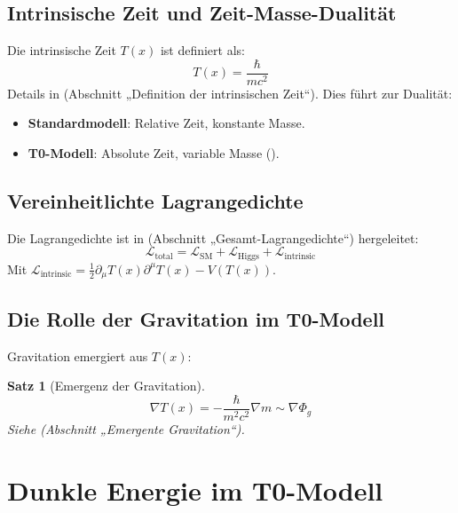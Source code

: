 \documentclass[a4paper,12pt]{article}
\newtheorem{theorem}{Satz}[section]
\theoremstyle{definition}
\theoremstyle{remark}
\newcommand{\Tfield}{T(x)}
\begin{document}
	\subsection{Intrinsische Zeit und Zeit-Masse-Dualität}
	
	Die intrinsische Zeit \(\Tfield\) ist definiert als:
	\begin{equation}
		\Tfield = \frac{\hbar}{m c^2}
	\end{equation}
	Details in \cite{pascher_params_2025} (Abschnitt „Definition der intrinsischen Zeit“). Dies führt zur Dualität:
	\begin{itemize}
		\item \textbf{Standardmodell}: Relative Zeit, konstante Masse.
		\item \textbf{T0-Modell}: Absolute Zeit, variable Masse (\cite{pascher_params_2025}).
	\end{itemize}
	
	\subsection{Vereinheitlichte Lagrangedichte}
	
	Die Lagrangedichte ist in \cite{pascher_lagrange_2025} (Abschnitt „Gesamt-Lagrangedichte“) hergeleitet:
	\begin{equation}
		\mathcal{L}_\text{total} = \mathcal{L}_\text{SM} + \mathcal{L}_\text{Higgs} + \mathcal{L}_\text{intrinsic}
	\end{equation}
	Mit \(\mathcal{L}_\text{intrinsic} = \frac{1}{2} \partial_\mu \Tfield \partial^\mu \Tfield - V(\Tfield)\).
	
	\subsection{Die Rolle der Gravitation im T0-Modell}
	
	Gravitation emergiert aus \(\Tfield\):
	\begin{theorem}[Emergenz der Gravitation]
		\begin{equation}
			\nabla \Tfield = -\frac{\hbar}{m^2 c^2} \nabla m \sim \nabla \Phi_g
		\end{equation}
		Siehe \cite{pascher_galaxies_2025} (Abschnitt „Emergente Gravitation“).
	\end{theorem}
	
	\section{Dunkle Energie im T0-Modell}
	
\end{document}
